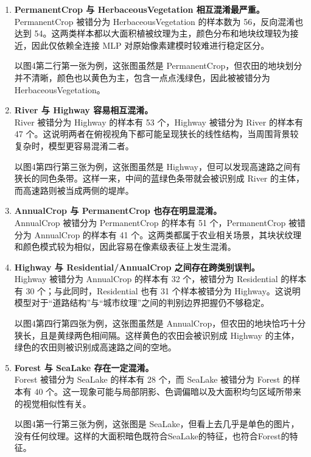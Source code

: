 \documentclass[UTF8,a4paper,11pt]{ctexart}
\begin{document}
\begin{enumerate}
    \item \textbf{PermanentCrop 与 HerbaceousVegetation 相互混淆最严重。} \\
    PermanentCrop 被错分为 HerbaceousVegetation 的样本数为 56，反向混淆也达到 54。这两类样本都以大面积植被纹理为主，颜色分布和地块纹理较为接近，因此仅依赖全连接 MLP 对原始像素建模时较难进行稳定区分。
    
    以图4第二行第一张为例，这张图虽然是 PermanentCrop，但农田的地块划分并不清晰，颜色也以黄色为主，包含一点点浅绿色，因此被被错分为 HerbaceousVegetation。

    \item \textbf{River 与 Highway 容易相互混淆。} \\
    River 被错分为 Highway 的样本有 53 个，Highway 被错分为 River 的样本有 47 个。这说明两者在俯视视角下都可能呈现狭长的线性结构，当周围背景较复杂时，模型更容易混淆二者。
    
    以图4第四行第三张为例，这张图虽然是 Highway，但可以发现高速路之间有狭长的同色条带。这样一来，中间的蓝绿色条带就会被识别成 River 的主体，而高速路则被当成两侧的堤岸。

    \item \textbf{AnnualCrop 与 PermanentCrop 也存在明显混淆。} \\
    AnnualCrop 被错分为 PermanentCrop 的样本有 51 个，PermanentCrop 被错分为 AnnualCrop 的样本有 41 个。这两类都属于农业相关场景，其块状纹理和颜色模式较为相似，因此容易在像素级表征上发生混淆。

    \item \textbf{Highway 与 Residential/AnnualCrop 之间存在跨类别误判。} \\
    Highway 被错分为 AnnualCrop 的样本有 32 个，被错分为 Residential 的样本有 30 个；与此同时，Residential 也有 31 个样本被错分为 Highway。这说明模型对于“道路结构”与“城市纹理”之间的判别边界把握仍不够稳定。
    
    以图4第四行第四张为例，这张图虽然是 AnnualCrop，但农田的地块恰巧十分狭长，且是黄绿两色相间隔。这样黄色的农田会被识别成 Highway 的主体，绿色的农田则被识别成高速路之间的空地。

    \item \textbf{Forest 与 SeaLake 存在一定混淆。} \\
    Forest 被错分为 SeaLake 的样本有 28 个，而 SeaLake 被错分为 Forest 的样本有 40 个。这一现象可能与局部阴影、色调偏暗以及大面积均匀区域所带来的视觉相似性有关。
    
    以图4第一行第三张为例，这张图是 SeaLake，但看上去几乎是单色的图片，没有任何纹理。这样的大面积暗色既符合SeaLake的特征，也符合Forest的特征。
\end{enumerate}
\end{document}
